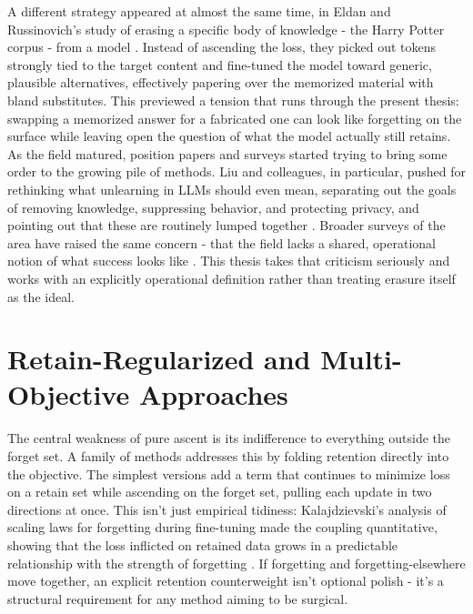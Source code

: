\documentclass[a4paper,12pt]{report}
\begin{document}
A different strategy appeared at almost the same time, in Eldan and Russinovich's study of erasing a specific body of knowledge - the Harry Potter corpus - from a model \parencite{eldan2023harrypotter}. Instead of ascending the loss, they picked out tokens strongly tied to the target content and fine-tuned the model toward generic, plausible alternatives, effectively papering over the memorized material with bland substitutes. This previewed a tension that runs through the present thesis: swapping a memorized answer for a fabricated one can look like forgetting on the surface while leaving open the question of what the model actually still retains. As the field matured, position papers and surveys started trying to bring some order to the growing pile of methods. Liu and colleagues, in particular, pushed for rethinking what unlearning in LLMs should even mean, separating out the goals of removing knowledge, suppressing behavior, and protecting privacy, and pointing out that these are routinely lumped together \parencite{liu2024rethinking}. Broader surveys of the area have raised the same concern - that the field lacks a shared, operational notion of what success looks like \parencite{koundinya2024unlearning}. This thesis takes that criticism seriously and works with an explicitly operational definition rather than treating erasure itself as the ideal.
\section{Retain-Regularized and Multi-Objective Approaches}
The central weakness of pure ascent is its indifference to everything outside the forget set. A family of methods addresses this by folding retention directly into the objective. The simplest versions add a term that continues to minimize loss on a retain set while ascending on the forget set, pulling each update in two directions at once. This isn't just empirical tidiness: Kalajdzievski's analysis of scaling laws for forgetting during fine-tuning made the coupling quantitative, showing that the loss inflicted on retained data grows in a predictable relationship with the strength of forgetting \parencite{kalajdzievski2024scaling}. If forgetting and forgetting-elsewhere move together, an explicit retention counterweight isn't optional polish - it's a structural requirement for any method aiming to be surgical.
\end{document}
